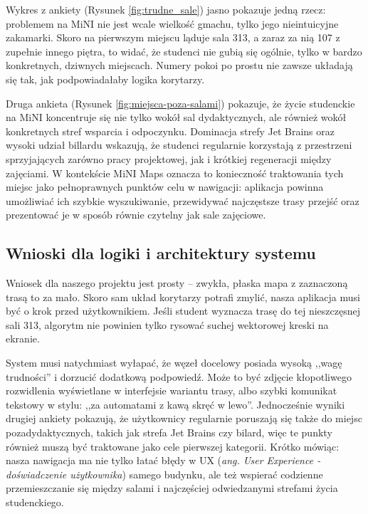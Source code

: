 \documentclass[14pt,a4paper]{extarticle}
\begin{document}
Wykres z ankiety (Rysunek \ref{fig:trudne_sale}) jasno pokazuje jedną rzecz: problemem na MiNI nie jest wcale wielkość gmachu, tylko jego nieintuicyjne zakamarki. Skoro na pierwszym miejscu ląduje sala 313, a zaraz za nią 107 z zupełnie innego piętra, to widać, że studenci nie gubią się ogólnie, tylko w bardzo konkretnych, dziwnych miejscach. Numery pokoi po prostu nie zawsze układają się tak, jak podpowiadałaby logika korytarzy.

Druga ankieta (Rysunek \ref{fig:miejsca-poza-salami}) pokazuje, że życie studenckie na MiNI koncentruje się nie tylko wokół sal dydaktycznych, ale również wokół konkretnych stref wsparcia i odpoczynku. Dominacja strefy Jet Brains oraz wysoki udział billardu wskazują, że studenci regularnie korzystają z przestrzeni sprzyjających zarówno pracy projektowej, jak i krótkiej regeneracji między zajęciami. W kontekście MiNI Maps oznacza to konieczność traktowania tych miejsc jako pełnoprawnych punktów celu w nawigacji: aplikacja powinna umożliwiać ich szybkie wyszukiwanie, przewidywać najczęstsze trasy przejść oraz prezentować je w sposób równie czytelny jak sale zajęciowe.

\subsection{Wnioski dla logiki i architektury systemu}

Wniosek dla naszego projektu jest prosty -- zwykła, płaska mapa z zaznaczoną trasą to za mało. Skoro sam układ korytarzy potrafi zmylić, nasza aplikacja musi być o krok przed użytkownikiem. Jeśli student wyznacza trasę do tej nieszczęsnej sali 313, algorytm nie powinien tylko rysować suchej wektorowej kreski na ekranie.

System musi natychmiast wyłapać, że węzeł docelowy posiada wysoką ,,wagę trudności'' i dorzucić dodatkową podpowiedź. Może to być zdjęcie kłopotliwego rozwidlenia wyświetlane w interfejsie wariantu trasy, albo szybki komunikat tekstowy w stylu: ,,za automatami z kawą skręć w lewo''. Jednocześnie wyniki drugiej ankiety pokazują, że użytkownicy regularnie poruszają się także do miejsc pozadydaktycznych, takich jak strefa Jet Brains czy bilard, więc te punkty również muszą być traktowane jako cele pierwszej kategorii. Krótko mówiąc: nasza nawigacja ma nie tylko łatać błędy w UX (\textit{ang. User Experience - doświadczenie użytkownika}) samego budynku, ale też wspierać codzienne przemieszczanie się między salami i najczęściej odwiedzanymi strefami życia studenckiego.
\end{document}
